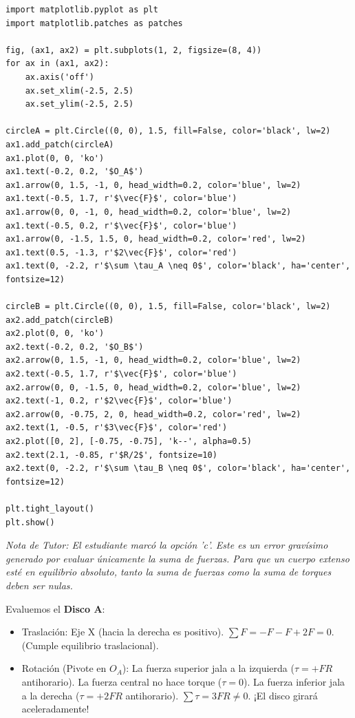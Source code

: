 \documentclass[12pt, a4paper]{article}
\begin{document}
\begin{verbatim}
import matplotlib.pyplot as plt
import matplotlib.patches as patches

fig, (ax1, ax2) = plt.subplots(1, 2, figsize=(8, 4))
for ax in (ax1, ax2):
    ax.axis('off')
    ax.set_xlim(-2.5, 2.5)
    ax.set_ylim(-2.5, 2.5)

circleA = plt.Circle((0, 0), 1.5, fill=False, color='black', lw=2)
ax1.add_patch(circleA)
ax1.plot(0, 0, 'ko')
ax1.text(-0.2, 0.2, '$O_A$')
ax1.arrow(0, 1.5, -1, 0, head_width=0.2, color='blue', lw=2)
ax1.text(-0.5, 1.7, r'$\vec{F}$', color='blue')
ax1.arrow(0, 0, -1, 0, head_width=0.2, color='blue', lw=2)
ax1.text(-0.5, 0.2, r'$\vec{F}$', color='blue')
ax1.arrow(0, -1.5, 1.5, 0, head_width=0.2, color='red', lw=2)
ax1.text(0.5, -1.3, r'$2\vec{F}$', color='red')
ax1.text(0, -2.2, r'$\sum \tau_A \neq 0$', color='black', ha='center', fontsize=12)

circleB = plt.Circle((0, 0), 1.5, fill=False, color='black', lw=2)
ax2.add_patch(circleB)
ax2.plot(0, 0, 'ko')
ax2.text(-0.2, 0.2, '$O_B$')
ax2.arrow(0, 1.5, -1, 0, head_width=0.2, color='blue', lw=2)
ax2.text(-0.5, 1.7, r'$\vec{F}$', color='blue')
ax2.arrow(0, 0, -1.5, 0, head_width=0.2, color='blue', lw=2)
ax2.text(-1, 0.2, r'$2\vec{F}$', color='blue')
ax2.arrow(0, -0.75, 2, 0, head_width=0.2, color='red', lw=2)
ax2.text(1, -0.5, r'$3\vec{F}$', color='red')
ax2.plot([0, 2], [-0.75, -0.75], 'k--', alpha=0.5)
ax2.text(2.1, -0.85, r'$R/2$', fontsize=10)
ax2.text(0, -2.2, r'$\sum \tau_B \neq 0$', color='black', ha='center', fontsize=12)

plt.tight_layout()
plt.show()
\end{verbatim}

\textit{Nota de Tutor: El estudiante marcó la opción 'c'. Este es un error gravísimo generado por evaluar únicamente la suma de fuerzas. Para que un cuerpo extenso esté en equilibrio absoluto, tanto la suma de fuerzas como la suma de torques deben ser nulas.}

Evaluemos el \textbf{Disco A}:
\begin{itemize}
    \item Traslación: Eje X (hacia la derecha es positivo). $\sum F = -F - F + 2F = 0$. (Cumple equilibrio traslacional).
    \item Rotación (Pivote en $O_A$): La fuerza superior jala a la izquierda ($\tau = +FR$ antihorario). La fuerza central no hace torque ($\tau = 0$). La fuerza inferior jala a la derecha ($\tau = +2FR$ antihorario). $\sum \tau = 3FR \neq 0$. ¡El disco girará aceleradamente!
\end{itemize}
\end{document}
